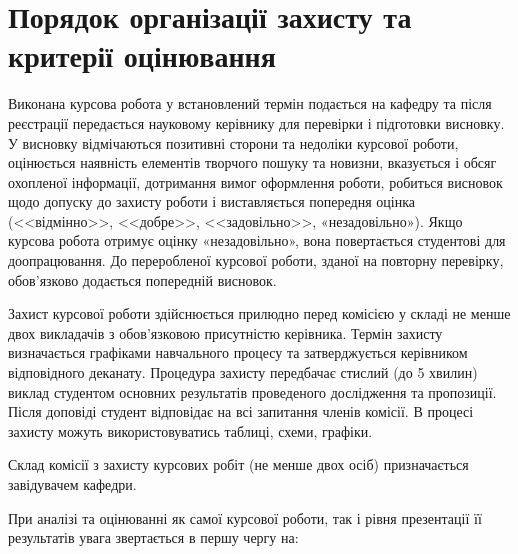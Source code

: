 \chapter{Порядок організації захисту та критерії оцінювання}
Виконана курсова робота у встановлений термін подається на кафедру та після реєстрації передається науковому керівнику для перевірки і підготовки висновку. У висновку відмічаються позитивні сторони та недоліки курсової роботи, оцінюється наявність елементів творчого пошуку та новизни, вказується і обсяг охопленої інформації, дотримання вимог оформлення роботи, робиться висновок щодо допуску до захисту роботи і виставляється попередня оцінка (<<відмінно>>, <<добре>>, <<задовільно>>, «незадовільно»). Якщо курсова робота отримує оцінку «незадовільно», вона повертається студентові для доопрацювання. До переробленої курсової роботи, зданої на повторну перевірку, обов’язково додається попередній висновок.

Захист курсової роботи здійснюється прилюдно перед комісією у складі не менше двох викладачів з обов'язковою присутністю керівника. Термін захисту визначається графіками навчального процесу та затверджується керівником відповідного деканату. Процедура захисту передбачає стислий (до 5 хвилин) виклад студентом основних результатів проведеного дослідження та пропозиції. Після доповіді студент відповідає на всі запитання членів комісії. В процесі захисту можуть використовуватись таблиці, схеми, графіки.

Склад комісії з захисту курсових робіт (не менше двох осіб) призначається завідувачем кафедри.

При аналізі та оцінюванні як самої курсової роботи, так і рівня презентації її результатів увага звертається в першу чергу на:

